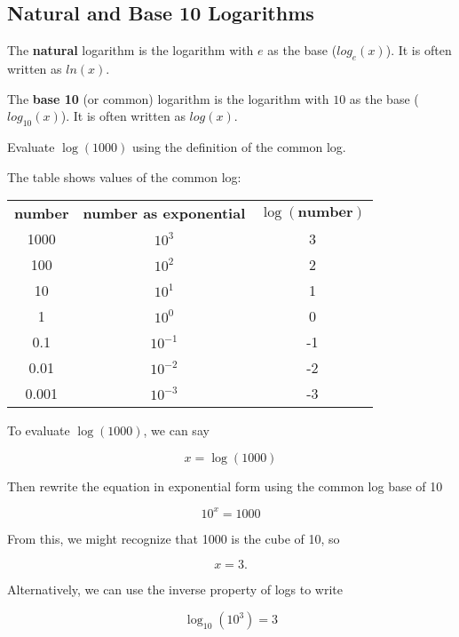 \subsection{Natural and Base 10 Logarithms}
\begin{definition}
    The \textbf{natural} logarithm is the logarithm with $e$ as the base ($log_e(x)$). It is often written as $ln(x)$.
\end{definition}
\begin{definition}
    The \textbf{base 10} (or common) logarithm is the logarithm with $10$ as the base ($log_10(x)$). It is often written as $log(x)$.
\end{definition}

\begin{example}
    Evaluate $\log(1000)$ using the definition of the common log.
\end{example}
\begin{solution}
    The table shows values of the common log:

    \begin{center}
        \begin{tabular}{ c c c }
            \textbf{number} & \textbf{number as exponential} & $\log(\textbf{number})$ \\
            1000            & $10^3$                         & 3                       \\
            100             & $10^2$                         & 2                       \\
            10              & $10^1$                         & 1                       \\
            1               & $10^0$                         & 0                       \\
            0.1             & $10^{-1}$                      & -1                      \\
            0.01            & $10^{-2}$                      & -2                      \\
            0.001           & $10^{-3}$                      & -3                      \\
        \end{tabular}
    \end{center}

    To evaluate $\log(1000)$, we can say

    \[ x = \log(1000) \]

    Then rewrite the equation in exponential form using the common log base of 10

    \[ 10^x = 1000 \]

    From this, we might recognize that 1000 is the cube of 10, so

    \[ x = 3. \]

    Alternatively, we can use the inverse property of logs to write

    \[ \log_{10}(10^3) = 3 \]
\end{solution}

